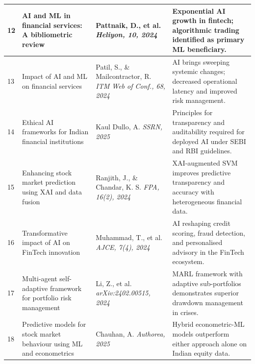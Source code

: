 \documentclass[12pt,a4paper,oneside]{report}
\theoremstyle{definition}
\theoremstyle{remark}
\begin{document}
\begin{center}
\begin{longtable}{|p{0.8cm}|p{4.2cm}|>{\raggedright\arraybackslash}p{4cm}|p{4.5cm}|}
12 & AI and ML in financial services: A bibliometric review \cite{Pattnaik2024AIBibliometric} & Pattnaik, D., et al. \newline\newline \textit{Heliyon, 10, 2024} & Exponential AI growth in fintech; algorithmic trading identified as primary ML beneficiary. \\ \hline

13 & Impact of AI and ML on financial services \cite{Patil2024AIFinServices} & Patil, S., \& Mailcontractor, R. \newline\newline \textit{ITM Web of Conf., 68, 2024} & AI brings sweeping systemic changes; decreased operational latency and improved risk management. \\ \hline

14 & Ethical AI frameworks for Indian financial institutions \cite{KaulDullo2025EthicalAI} & Kaul Dullo, A. \newline\newline \textit{SSRN, 2025} & Principles for transparency and auditability required for deployed AI under SEBI and RBI guidelines. \\ \hline

15 & Enhancing stock market prediction using XAI and data fusion \cite{Ranjith2024XAISVM} & Ranjith, J., \& Chandar, K. S. \newline\newline \textit{FPA, 16(2), 2024} & XAI-augmented SVM improves predictive transparency and accuracy with heterogeneous financial data. \\ \hline

16 & Transformative impact of AI on FinTech innovation \cite{Muhammad2024AIFintech} & Muhammad, T., et al. \newline\newline \textit{AJCE, 7(4), 2024} & AI reshaping credit scoring, fraud detection, and personalised advisory in the FinTech ecosystem. \\ \hline

17 & Multi-agent self-adaptive framework for portfolio risk management \cite{LiMASA2024} & Li, Z., et al. \newline\newline \textit{arXiv:2402.00515, 2024} & MARL framework with adaptive sub-portfolios demonstrates superior drawdown management in crises. \\ \hline

18 & Predictive models for stock market behaviour using ML and econometrics \cite{Chauhan2025HybridPrediction} & Chauhan, A. \newline\newline \textit{Authorea, 2025} & Hybrid econometric-ML models outperform either approach alone on Indian equity data. \\ \hline


\end{longtable}
\end{center}
\end{document}
